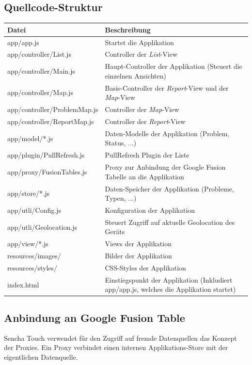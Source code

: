 \subsection{Quellcode-Struktur}

\begin{tabular}{|l|p{10cm}|}
\hline 
\textbf{Datei} & \textbf{Beschreibung} \\ 
\hline 
app/app.js & Startet die Applikation \\ 
\hline 
app/controller/List.js & Controller der \emph{List}-View \\ 
\hline 
app/controller/Main.js & Haupt-Controller der Applikation (Steuert die einzelnen Ansichten) \\ 
\hline 
app/controller/Map.js & Basis-Controller der \emph{Report}-View und der \emph{Map}-View \\ 
\hline 
app/controller/ProblemMap.js & Controller der \emph{Map}-View \\ 
\hline 
app/controller/ReportMap.js & Controller der \emph{Report}-View \\ 
\hline 
app/model/*.js & Daten-Modelle der Applikation (Problem, Status, ...) \\ 
\hline 
app/plugin/PullRefresh.js & PullRefresh Plugin der Liste \\ 
\hline 
app/proxy/FusionTables.js & Proxy zur Anbindung der Google Fusion Tabelle an die Applikation \\ 
\hline 
app/store/*.js & Daten-Speicher der Applikation (Probleme, Typen, ...) \\ 
\hline 
app/utli/Config.js & Konfiguration der Applikation \\ 
\hline 
app/utli/Geolocation.js & Steuert Zugriff auf aktuelle Geolocation des Geräts \\ 
\hline 
app/view/*.js & Views der Applikation \\ 
\hline 
resources/images/ & Bilder der Applikation \\ 
\hline 
resources/styles/ & CSS-Styles der Applikation \\ 
\hline 
index.html & Einstiegspunkt der Applikation (Inkludiert app/app.js, welches die Applikation startet) \\ 
\hline
\end{tabular} 

\subsection{Anbindung an Google Fusion Table}
Sencha Touch verwendet für den Zugriff auf fremde Datenquellen das Konzept der Proxies. Ein Proxy verbindet einen internen Applikations-Store mit der eigentlichen Datenquelle.

